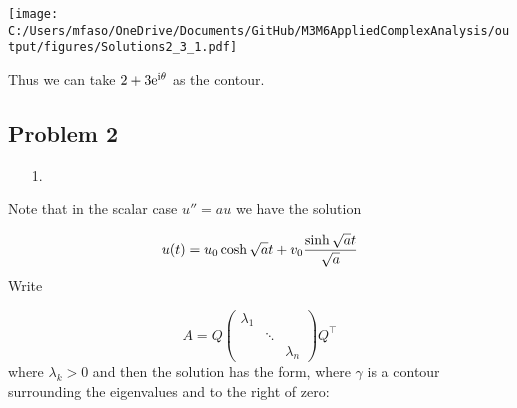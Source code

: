 \documentclass[12pt,a4paper]{article}
\def\I{ {\rm i} }
\def\E{ {\rm e} }
\begin{document}
\texttt{[image: C:/Users/mfaso/OneDrive/Documents/GitHub/M3M6AppliedComplexAnalysis/output/figures/Solutions2\_3\_1.pdf]}

Thus we can take $2 + 3 \E^{\I \theta}$ as the contour.

\subsection{Problem 2}
\begin{itemize}
\item[1. ] \end{itemize}
Note that in the scalar case $u'' = a u$ we have the solution

\[
u(t) = u_0 \cosh \sqrt{a} t + v_0 {\sinh \sqrt{a} t \over \sqrt a}
\]
Write

\[
A = Q \begin{pmatrix} \lambda_1 \\ & \ddots \\
                        && \lambda_n \end{pmatrix}  Q^\top
\]
where $\lambda_k > 0$ and then the solution has the form, where $\gamma$ is a contour surrounding the eigenvalues and to the right of zero:
\end{document}
